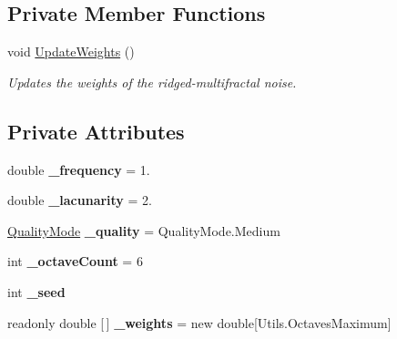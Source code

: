 \subsection*{Private Member Functions}
\begin{DoxyCompactItemize}
\item 
void \hyperlink{class_lib_noise_1_1_generator_1_1_ridged_multifractal_a4baf9aa96e1efc66ade537050d94389b}{Update\+Weights} ()
\begin{DoxyCompactList}\small\item\em Updates the weights of the ridged-\/multifractal noise. \end{DoxyCompactList}\end{DoxyCompactItemize}
\subsection*{Private Attributes}
\begin{DoxyCompactItemize}
\item 
\mbox{\label{class_lib_noise_1_1_generator_1_1_ridged_multifractal_a4479cda66462e628aa65f1bb18c412b2}} 
double {\bfseries \+\_\+frequency} = 1.
\item 
\mbox{\label{class_lib_noise_1_1_generator_1_1_ridged_multifractal_a894a160c20f107c22a8b2bcc57695ca1}} 
double {\bfseries \+\_\+lacunarity} = 2.
\item 
\mbox{\label{class_lib_noise_1_1_generator_1_1_ridged_multifractal_a32b2378229f843ba11c0b4c31c55927e}} 
\hyperlink{namespace_lib_noise_ab253d2180e71b8b4b51e250163ca0e27}{Quality\+Mode} {\bfseries \+\_\+quality} = Quality\+Mode.\+Medium
\item 
\mbox{\label{class_lib_noise_1_1_generator_1_1_ridged_multifractal_a7c10932249b48176a505547b213c7a5e}} 
int {\bfseries \+\_\+octave\+Count} = 6
\item 
\mbox{\label{class_lib_noise_1_1_generator_1_1_ridged_multifractal_a31891999af296585f8a560622f50751c}} 
int {\bfseries \+\_\+seed}
\item 
\mbox{\label{class_lib_noise_1_1_generator_1_1_ridged_multifractal_a74aca633478a994d0620a0cc7897c4e4}} 
readonly double \mbox{[}$\,$\mbox{]} {\bfseries \+\_\+weights} = new double\mbox{[}Utils.\+Octaves\+Maximum\mbox{]}
\end{DoxyCompactItemize}
